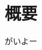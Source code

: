 \documentclass[../main.tex]{subfiles}
\begin{document}
\chapter*{概要}\label{sec:abstract}
がいよー
\end{document}
